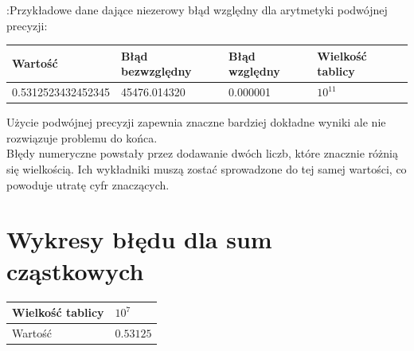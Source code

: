 \documentclass[11pt, a4paper]{article}
\begin{document}
\vphantom\vphantom\vphantom :Przykładowe dane dające niezerowy błąd względny dla arytmetyki podwójnej precyzji:
\begin{center}
    \begin{tabular}{| l | l | l | l |}
    \hline
    Wartość & Błąd bezwzględny & Błąd względny & Wielkość tablicy\\ \hline
    0.5312523432452345 & 45476.014320 & 0.000001 & \begin{math} 10^{11} \end{math}\\ \hline
    \end{tabular}
\end{center}
\vphantom\vphantom
Użycie podwójnej precyzji zapewnia znaczne bardziej dokładne wyniki ale nie rozwiązuje problemu do końca.\\Błędy numeryczne powstały przez dodawanie dwóch liczb, które znacznie różnią się wielkością. Ich wykładniki muszą zostać sprowadzone do tej samej wartości, co powoduje utratę cyfr znaczących.


\section{Wykresy błędu dla sum cząstkowych}
\vphantom\vphantom
\begin{tabular}{| l | l |} \hline
Wielkość tablicy & \begin{math} 10^7 \end{math}\\ \hline
Wartość & \begin{math} 0.53125 \end{math} \\ \hline
\end{tabular}
\end{document}
